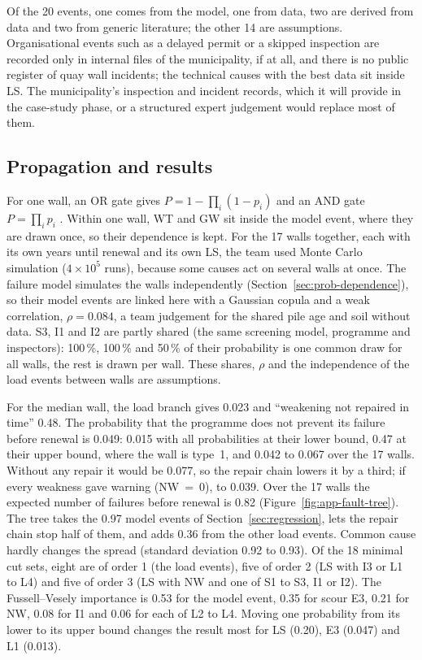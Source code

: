 Of the 20 events, one comes from the model, one from data, two are derived from
data and two from generic literature; the other 14 are assumptions.
Organisational events such as a delayed permit or a skipped inspection are
recorded only in internal files of the municipality, if at all, and there is no
public register of quay wall incidents; the technical causes with the best
data sit inside LS. The municipality's inspection and incident records,
which it will provide in the case-study phase, or a structured expert judgement would replace
most of them.

\subsection{Propagation and results}\label{sec:ft-results}

For one wall, an OR gate gives $P = 1-\prod_i(1-p_i)$ and an AND gate
$P=\prod_i p_i$ \parencite{vesely1981ftHandbook}. Within one wall, WT and GW sit
inside the model event, where they are drawn once, so their dependence is kept.
For the 17 walls together, each with its own years until renewal and its own LS,
the team used Monte Carlo simulation ($4\times10^5$ runs), because some causes
act on several walls at once. The failure model simulates the walls
independently (Section~\ref{sec:prob-dependence}), so their model events are
linked here with a Gaussian copula and a weak correlation, $\rho=0.084$, a team
judgement for the shared pile age and soil without data.
S3, I1 and I2 are partly shared (the same screening model, programme and
inspectors): 100\,\%, 100\,\% and 50\,\% of their probability is one common draw
for all walls, the rest is drawn per wall. These shares, $\rho$ and the
independence of the load events between walls are assumptions.

For the median wall, the load branch gives 0.023 and ``weakening not repaired in
time'' 0.48. The probability that the programme does not prevent its failure
before renewal is 0.049: 0.015 with all probabilities at their lower bound, 0.47
at their upper bound, where the wall is type~1, and 0.042 to 0.067 over the 17
walls. Without any repair it would be 0.077, so the repair chain lowers it by a
third; if every weakness gave warning (NW~=~0), to 0.039. Over the 17 walls the
expected number of failures before renewal is 0.82
(Figure~\ref{fig:app-fault-tree}). The tree takes the 0.97 model events of
Section~\ref{sec:regression}, lets the repair chain stop half of them, and adds
0.36 from the other load events. Common cause hardly changes the spread
(standard deviation 0.92 to 0.93). Of the 18 minimal cut sets, eight are of order 1
(the load events), five of order 2 (LS with I3 or L1 to L4) and five of order 3
(LS with NW and one of S1 to S3, I1 or I2). The Fussell--Vesely importance
\parencite{fussell1975} is 0.53 for the model event, 0.35 for scour E3, 0.21
for NW, 0.08 for I1 and 0.06 for each of L2 to L4. Moving one probability from
its lower to its upper bound changes the result most for LS (0.20), E3 (0.047)
and L1 (0.013).

